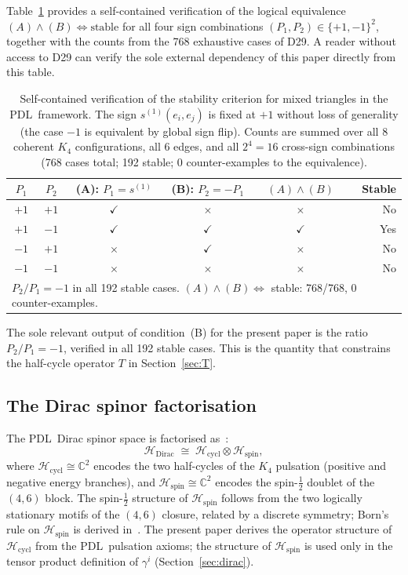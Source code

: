 \documentclass[11pt,a4paper]{article}
\theoremstyle{definition}
\newcommand{\PDL}{\textnormal{PDL}}
\newcommand{\Hcycl}{\mathcal{H}_{\mathrm{cycl}}}
\newcommand{\Hspin}{\mathcal{H}_{\mathrm{spin}}}
\newcommand{\HDirac}{\mathcal{H}_{\mathrm{Dirac}}}
\newcommand{\Kfour}{K_4}
\begin{document}
Table~\ref{tab:condB} provides a self-contained verification of the logical equivalence $(A)\wedge(B) \Leftrightarrow \text{stable}$ for all four sign combinations $(P_1, P_2) \in \{+1,-1\}^2$, together with the counts from the 768 exhaustive cases of D29. A reader without access to D29 can verify the sole external dependency of this paper directly from this table.

\begin{table}[ht]
\centering
\caption{Self-contained verification of the stability criterion for mixed triangles in the \PDL\ framework. The sign $s^{(1)}(e_i, e_j)$ is fixed at $+1$ without loss of generality (the case $-1$ is equivalent by global sign flip). Counts are summed over all 8 coherent $\Kfour$ configurations, all 6 edges, and all $2^4 = 16$ cross-sign combinations (768 cases total; 192 stable; 0 counter-examples to the equivalence).}
\label{tab:condB}
\begin{tabular}{cccccr}
\toprule
$P_1$ & $P_2$ & (A): $P_1 = s^{(1)}$ & (B): $P_2 = -P_1$ & $(A)\wedge(B)$ & Stable \\
\midrule
$+1$ & $+1$ & $\checkmark$ & $\times$ & $\times$ & No \\
$+1$ & $-1$ & $\checkmark$ & $\checkmark$ & $\checkmark$ & Yes \\
$-1$ & $+1$ & $\times$ & $\checkmark$ & $\times$ & No \\
$-1$ & $-1$ & $\times$ & $\times$ & $\times$ & No \\
\bottomrule
\multicolumn{6}{l}{\small $P_2/P_1 = -1$ in all 192 stable cases. $(A)\wedge(B) \Leftrightarrow$ stable: 768/768, 0 counter-examples.}
\end{tabular}
\end{table}

The sole relevant output of condition~(B) for the present paper is the ratio $P_2/P_1 = -1$, verified in all 192 stable cases. This is the quantity that constrains the half-cycle operator $T$ in Section~\ref{sec:T}.

\subsection{The Dirac spinor factorisation}
\label{subsec:factorisation}

The \PDL\ Dirac spinor space is factorised as~\cite{Einstein_Dirac_PDL_2026}:
\begin{equation}
\HDirac \;\cong\; \Hcycl \otimes \Hspin, \label{eq:factorisation}
\end{equation}
where $\Hcycl \cong \mathbb{C}^2$ encodes the two half-cycles of the $\Kfour$ pulsation (positive and negative energy branches), and $\Hspin \cong \mathbb{C}^2$ encodes the spin-$\tfrac{1}{2}$ doublet of the $(4,6)$ block. The spin-$\tfrac{1}{2}$ structure of $\Hspin$ follows from the two logically stationary motifs of the $(4,6)$ closure, related by a discrete symmetry; Born's rule on $\Hspin$ is derived in~\cite{Born_PDL_2026,Gleason_PDL_2026}. The present paper derives the operator structure of $\Hcycl$ from the \PDL\ pulsation axioms; the structure of $\Hspin$ is used only in the tensor product definition of $\gamma^i$ (Section~\ref{sec:dirac}).
\end{document}

